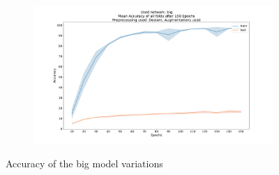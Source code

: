 \documentclass{article}
\begin{document}
\begin{minipage}[H]{1\linewidth}
\begin{figure}[H]
\begin{adjustwidth}{-8em}{-8em}
\begin{subfigure}{0.7\textwidth}
    \end{subfigure}
    \begin{subfigure}{0.7\textwidth}
        \centering
        \includegraphics[width=\textwidth]{Deslant_big_150_augmentations_acc}
    \end{subfigure}
    \end{adjustwidth}
\caption{Accuracy of the big model variations}

\label{fig:AccuracyBig}
\end{figure}


\end{minipage}
\end{document}
